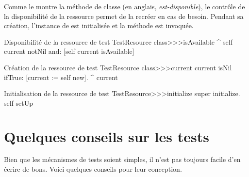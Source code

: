 \documentclass[a4paper,10pt,twoside]{book}
\begin{document}
{Comme le montre la méthode de classe  
(en anglais, \emph{est-disponible}), le contrôle de la disponibilité de la ressource permet 
de la recréer en cas de besoin. Pendant sa création, l'instance de  est 
initialisée et la méthode  est invoquée.


\begin{method}[testresourceisavailable]{Disponibilité de la ressource de test}
TestResource class>>>isAvailable
	^ self current notNil and: [self current isAvailable]
\end{method}
\begin{method}[testresourcecurrent]{Création de la ressource de test}
TestResource class>>>current
	current isNil ifTrue: [current := self new].
	^ current
\end{method}
\begin{method}[restresourceinitialize]{Initialisation de la ressource de test}
TestResource>>>initialize
  super initialize.
	self setUp
\end{method}

\section{Quelques conseils sur les tests}

Bien que les mécanismes de tests soient simples, il n'est pas toujours
facile d'en écrire de bons.
Voici quelques conseils pour leur conception.

\begin{description}



\end{description}}
\end{document}

